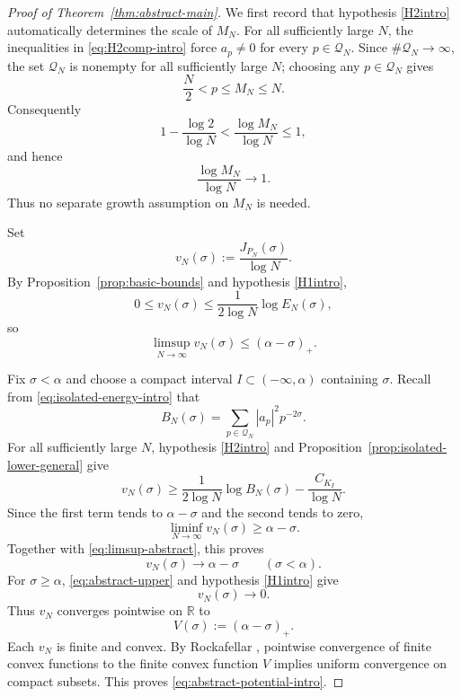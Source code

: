 \documentclass[11pt]{article}
\theoremstyle{definition}
\newcommand{\R}{\mathbb R}
\newcommand{\1}{\mathbf 1}
\begin{document}
\begin{proof}[Proof of Theorem~\ref{thm:abstract-main}]
We first record that hypothesis \ref{H2intro} automatically determines the scale of $M_N$.  For all sufficiently large $N$, the inequalities in \eqref{eq:H2comp-intro} force $a_p\neq0$ for every $p\in\mathcal Q_N$.  Since $\#\mathcal Q_N\to\infty$, the set $\mathcal Q_N$ is nonempty for all sufficiently large $N$; choosing any $p\in\mathcal Q_N$ gives
\[
\frac N2<p\le M_N\le N.
\]
Consequently
\begin{equation}\label{eq:MN-growth-automatic}
1-\frac{\log2}{\log N}
<\frac{\log M_N}{\log N}\le1,
\end{equation}
and hence
\begin{equation}\label{eq:MN-growth-intro}
\frac{\log M_N}{\log N}\longrightarrow1.
\end{equation}
Thus no separate growth assumption on $M_N$ is needed.

Set
\[
v_N(\sigma):=\frac{J_{P_N}(\sigma)}{\log N}.
\]
By Proposition~\ref{prop:basic-bounds} and hypothesis \ref{H1intro},
\begin{equation}\label{eq:abstract-upper}
0\le v_N(\sigma)
\le
\frac1{2\log N}\log E_N(\sigma),
\end{equation}
so
\begin{equation}\label{eq:limsup-abstract}
\limsup_{N\to\infty}v_N(\sigma)
\le(\alpha-\sigma)_+.
\end{equation}

Fix $\sigma<\alpha$ and choose a compact interval $I\subset(-\infty,\alpha)$ containing $\sigma$.  Recall from \eqref{eq:isolated-energy-intro} that
\[
B_N(\sigma)=\sum_{p\in\mathcal Q_N}|a_p|^2p^{-2\sigma}.
\]
For all sufficiently large $N$, hypothesis \ref{H2intro} and Proposition~\ref{prop:isolated-lower-general} give
\begin{equation}\label{eq:abstract-lower}
v_N(\sigma)
\ge
\frac1{2\log N}\log B_N(\sigma)
-
\frac{C_{K_I}}{\log N}.
\end{equation}
Since the first term tends to $\alpha-\sigma$ and the second tends to zero,
\[
\liminf_{N\to\infty}v_N(\sigma)\ge\alpha-\sigma.
\]
Together with \eqref{eq:limsup-abstract}, this proves
\begin{equation}\label{eq:pointwise-left}
v_N(\sigma)\longrightarrow\alpha-\sigma
\qquad(\sigma<\alpha).
\end{equation}
For $\sigma\ge\alpha$, \eqref{eq:abstract-upper} and hypothesis \ref{H1intro} give
\begin{equation}\label{eq:pointwise-right}
v_N(\sigma)\longrightarrow0.
\end{equation}
Thus $v_N$ converges pointwise on $\R$ to
\[
V(\sigma):=(\alpha-\sigma)_+.
\]
Each $v_N$ is finite and convex.  By Rockafellar \cite[Theorem~10.8]{Rockafellar1970}, pointwise convergence of finite convex functions to the finite convex function $V$ implies uniform convergence on compact subsets.  This proves \eqref{eq:abstract-potential-intro}.


\end{proof}
\end{document}
